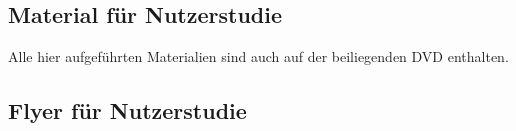 \appendix
\begin{appendices}
    \chapter{Material für Nutzerstudie}
    \label{appendix:study_material}
    Alle hier aufgeführten Materialien sind auch auf der beiliegenden DVD enthalten.
    
    \section*{Flyer für Nutzerstudie}
    \label{appendix:study_flyer}
    \begin{center}
    \end{center}
    

\end{appendices}
